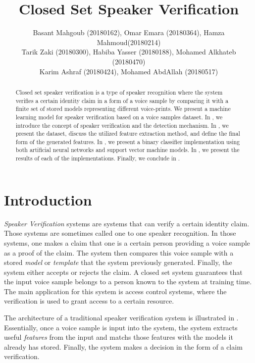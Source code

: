 \documentclass[twocolumn]{article}
\title{Closed Set Speaker Verification}
\author{
  Basant Mahgoub (20180162), Omar Emara (20180364), Hamza Mahmoud(20180214) \\
  Tarik Zaki (20180300), Habiba Yasser (20180188), Mohamed Alkhateb (20180470) \\
  Karim Ashraf (20180424), Mohamed AbdAllah (20180517)
}
\begin{document}
\maketitle

\begin{abstract}

  Closed set speaker verification is a type of speaker recognition where the
  system verifies a certain identity claim in a form of a voice sample by
  comparing it with a finite set of stored models representing different
  voice-prints. We present a machine learning model for speaker verification
  based on a voice samples dataset. In , we introduce the
  concept of speaker verification and the detection mechanism. In
  , we present the dataset, discuss the utilized feature
  extraction method, and define the final form of the generated features. In
  , we present a binary classifier implementation using
  both artificial neural networks and support vector machine models. In
  , we present the results of each of the implementations.
  Finally, we conclude in .

\end{abstract}

\section{Introduction}
\label{sec:Introduction}

\emph{Speaker Verification} systems are systems that can verify a certain
identity claim. Those systems are sometimes called one to one speaker
recognition. In those systems, one makes a claim that one is a certain person
providing a voice sample as a proof of the claim. The system then compares this
voice sample with a stored \emph{model} or \emph{template} that the system
previously generated. Finally, the system either accepts or rejects the claim. A
closed set system guarantees that the input voice sample belongs to a person
known to the system at training time. The main application for this system is
access control systems, where the verification is used to grant access to a
certain resource.

The architecture of a traditional speaker verification system is illustrated in
. Essentially, once a voice sample is input into
the system, the system extracts useful \emph{features} from the input and
matchs those features with the models it already has stored. Finally, the
system makes a decision in the form of a claim verification.
\end{document}
